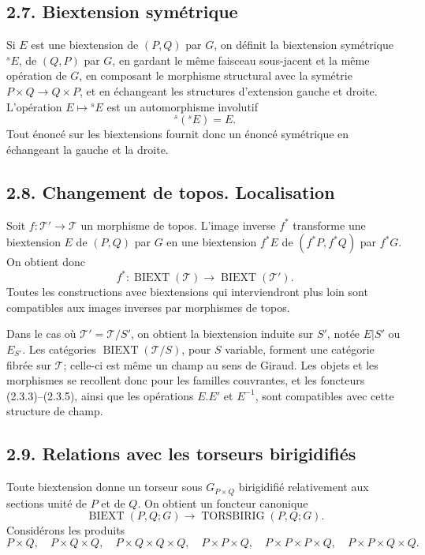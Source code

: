 \documentclass[11pt]{article}
\providecommand{\BIEXT}{\operatorname{BIEXT}}
\providecommand{\TORSBIRIG}{\operatorname{TORSBIRIG}}
\begin{document}
\subsection*{2.7. Biextension symétrique}
Si \(E\) est une biextension de \((P,Q)\) par \(G\), on définit la biextension symétrique \({}^sE\), de \((Q,P)\) par \(G\), en gardant le même faisceau sous-jacent et la même opération de \(G\), en composant le morphisme structural avec la symétrie \(P\times Q\to Q\times P\), et en échangeant les structures d'extension gauche et droite.  L'opération \(E\mapsto{}^sE\) est un automorphisme involutif
\begin{equation}\tag{2.7.1}
  {}^s({}^sE)=E.
\end{equation}
Tout énoncé sur les biextensions fournit donc un énoncé symétrique en échangeant la gauche et la droite.

\subsection*{2.8. Changement de topos. Localisation}
Soit \(f:\mathcal T'\to\mathcal T\) un morphisme de topos.  L'image inverse \(f^*\) transforme une biextension \(E\) de \((P,Q)\) par \(G\) en une biextension \(f^*E\) de \((f^*P,f^*Q)\) par \(f^*G\).  On obtient donc
\begin{equation}\tag{2.8.1}
  f^*:\BIEXT(\mathcal T)\longrightarrow\BIEXT(\mathcal T').
\end{equation}
Toutes les constructions avec biextensions qui interviendront plus loin sont compatibles aux images inverses par morphismes de topos.

Dans le cas où \(\mathcal T'=\mathcal T/S'\), on obtient la biextension induite sur \(S'\), notée \(E|S'\) ou \(E_{S'}\).  Les catégories \(\BIEXT(\mathcal T/S)\), pour \(S\) variable, forment une catégorie fibrée sur \(\mathcal T\); celle-ci est même un champ au sens de Giraud.  Les objets et les morphismes se recollent donc pour les familles couvrantes, et les foncteurs (2.3.3)--(2.3.5), ainsi que les opérations \(E.E'\) et \(E^{-1}\), sont compatibles avec cette structure de champ.

\subsection*{2.9. Relations avec les torseurs birigidifiés}
Toute biextension donne un torseur sous \(G_{P\times Q}\) birigidifié relativement aux sections unité de \(P\) et de \(Q\).  On obtient un foncteur canonique
\begin{equation}\tag{2.9.1}
  \BIEXT(P,Q;G)\longrightarrow\TORSBIRIG(P,Q;G).
\end{equation}
Considérons les produits
\begin{equation}\tag{2.9.2}
  P\times Q,
  \quad P\times Q\times Q,
  \quad P\times Q\times Q\times Q,
  \quad P\times P\times Q,
  \quad P\times P\times P\times Q,
  \quad P\times P\times Q\times Q.
\end{equation}
\end{document}
